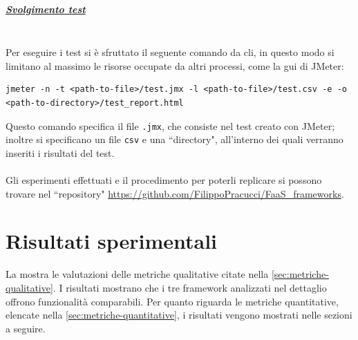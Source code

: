 \documentclass[12pt,a4paper,openany,twoside]{book}
\begin{document}
\paragraph{\underline{Svolgimento test}} ~\\
Per eseguire i test si è sfruttato il seguente comando da \ac{cli}, in questo modo si limitano al massimo le risorse occupate da altri processi, come la \ac{gui} di JMeter:
\begin{lstlisting}
jmeter -n -t <path-to-file>/test.jmx -l <path-to-file>/test.csv -e -o
<path-to-directory>/test_report.html\end{lstlisting}
Questo comando specifica il file \texttt{.jmx}, che consiste nel test creato con JMeter; inoltre si specificano un file \texttt{csv} e una ``directory", all'interno dei quali verranno inseriti i risultati del test.
\\ \\
Gli esperimenti effettuati e il procedimento per poterli replicare si possono trovare nel ``repository" \url{https://github.com/FilippoPracucci/FaaS_frameworks}.


\chapter{Risultati sperimentali}
\label{chap:risultati-sperimentali}

La  mostra le valutazioni delle metriche qualitative citate nella \cref{sec:metriche-qualitative}. I risultati mostrano che i tre framework analizzati nel dettaglio offrono funzionalità comparabili. Per quanto riguarda le metriche quantitative, elencate nella \cref{sec:metriche-quantitative}, i risultati vengono mostrati nelle sezioni a seguire.
\end{document}
